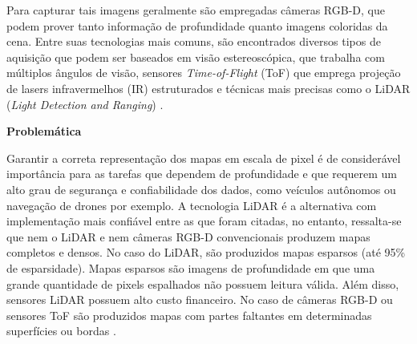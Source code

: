 Para capturar tais imagens geralmente são empregadas câmeras RGB-D, que podem prover tanto informação de profundidade quanto imagens coloridas da cena. Entre suas tecnologias mais comuns, são encontrados diversos tipos de aquisição que podem ser baseados em visão estereoscópica, que trabalha com múltiplos ângulos de visão, sensores \textit{Time-of-Flight} (ToF) que emprega projeção de lasers infravermelhos (IR) estruturados e técnicas mais precisas como o LiDAR (\textit{Light Detection and Ranging}) \cite{castellano2023performance}.






\textbf{Problemática} 

Garantir a correta representação dos mapas em escala de pixel é de considerável importância para as tarefas que dependem de profundidade e que requerem um alto grau de segurança e confiabilidade dos dados, como veículos autônomos ou navegação de drones por exemplo. A tecnologia LiDAR é a alternativa com implementação mais confiável entre as que foram citadas, no entanto, ressalta-se que nem o LiDAR e nem câmeras RGB-D convencionais produzem mapas completos e densos. No caso do LiDAR, são produzidos mapas esparsos (até 95\% de esparsidade). Mapas esparsos são imagens de profundidade em que uma grande quantidade de pixels espalhados não possuem leitura válida. Além disso, sensores LiDAR possuem alto custo financeiro. No caso de câmeras RGB-D ou sensores ToF são produzidos mapas com partes faltantes em determinadas superfícies ou bordas \cite{hu2012robust}. 







